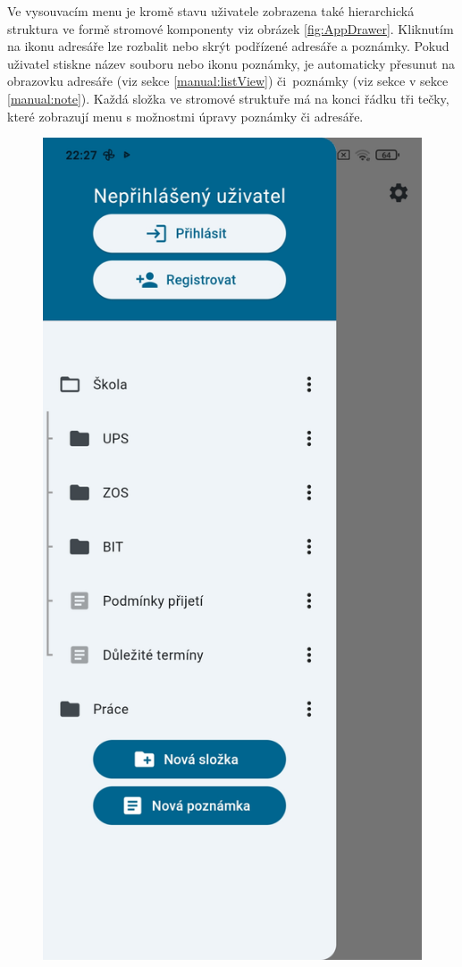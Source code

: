 \documentclass[czech, bc, kiv, he, iso690numb]{fasthesis}
\begin{document}
Ve vysouvacím menu je kromě stavu uživatele zobrazena také hierarchická struktura ve formě stromové komponenty viz obrázek \ref{fig:AppDrawer}. Kliknutím na ikonu adresáře lze rozbalit nebo skrýt podřízené adresáře a poznámky. Pokud uživatel stiskne název souboru nebo ikonu poznámky, je automaticky přesunut na obrazovku adresáře (viz sekce \ref{manual:listView}) či~poznámky (viz sekce v sekce \ref{manual:note}). Každá složka ve stromové struktuře má na konci řádku tři tečky, které zobrazují menu s možnostmi úpravy poznámky či adresáře.   

\begin{figure}[h!]
  \centering
  \begin{minipage}[h]{0.43\textwidth}
    \includegraphics[width=\textwidth]{img/BP-Runt/UserManual/DrawerNotLogged.jpg}

\end{minipage}
\end{figure}
\end{document}
